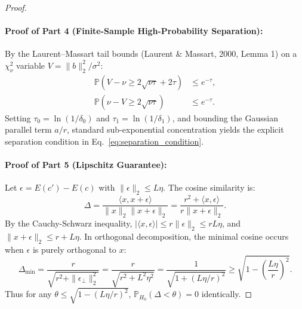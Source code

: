 \begin{proof}
\paragraph{Proof of Part 4 (Finite-Sample High-Probability Separation):}
By the Laurent--Massart tail bounds (Laurent \& Massart, 2000, Lemma 1) on a $\chi^2_\nu$ variable $V = \|b\|_2^2 / \sigma^2$:
\begin{align}
\mathbb{P}(V - \nu \ge 2\sqrt{\nu \tau} + 2\tau) &\le e^{-\tau}, \\
\mathbb{P}(\nu - V \ge 2\sqrt{\nu \tau}) &\le e^{-\tau}.
\end{align}
Setting $\tau_0 = \ln(1/\delta_0)$ and $\tau_1 = \ln(1/\delta_1)$, and bounding the Gaussian parallel term $a/r$, standard sub-exponential concentration yields the explicit separation condition in Eq.~\eqref{eq:separation_condition}.

\paragraph{Proof of Part 5 (Lipschitz Guarantee):}
Let $\epsilon = E(c') - E(c)$ with $\|\epsilon\|_2 \le L\eta$. The cosine similarity is:
\begin{equation}
\Delta = \frac{\langle x, x + \epsilon \rangle}{\|x\|_2 \|x + \epsilon\|_2} = \frac{r^2 + \langle x, \epsilon \rangle}{r \|x + \epsilon\|_2}.
\end{equation}
By the Cauchy-Schwarz inequality, $|\langle x, \epsilon \rangle| \le r \|\epsilon\|_2 \le r L\eta$, and $\|x + \epsilon\|_2 \le r + L\eta$.
In orthogonal decomposition, the minimal cosine occurs when $\epsilon$ is purely orthogonal to $x$:
\begin{equation}
\Delta_{\min} = \frac{r}{\sqrt{r^2 + \|\epsilon_\perp\|_2^2}} = \frac{r}{\sqrt{r^2 + L^2\eta^2}} = \frac{1}{\sqrt{1 + (L\eta/r)^2}} \ge \sqrt{1 - \left( \frac{L\eta}{r} \right)^2}.
\end{equation}
Thus for any $\theta \le \sqrt{1 - (L\eta/r)^2}$, $\mathbb{P}_{H_0}(\Delta < \theta) = 0$ identically.
\end{proof}
